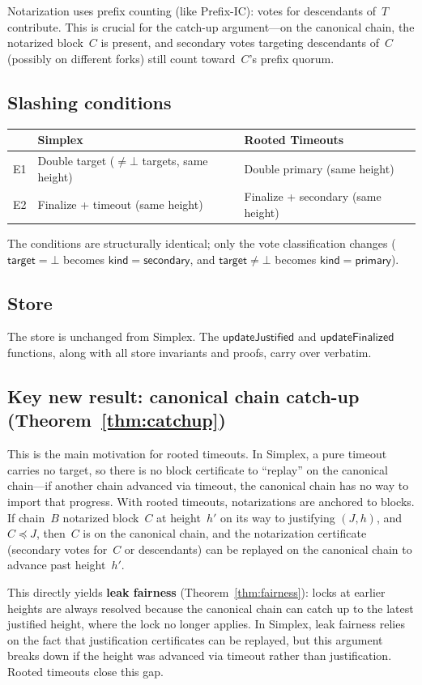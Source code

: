 \ifx\litemode\undefined\documentclass{article}\fi
\theoremstyle{plain}
\theoremstyle{definition}
\theoremstyle{remark}
\begin{document}
Notarization uses prefix counting (like Prefix-IC): votes for descendants of~$T$ contribute.
This is crucial for the catch-up argument---on the canonical chain, the notarized block~$C$ is present, and secondary votes targeting descendants of~$C$ (possibly on different forks) still count toward~$C$'s prefix quorum.

\subsection*{Slashing conditions}

\begin{center}
\begin{tabularx}{\textwidth}{lXX}
\toprule
& \textbf{Simplex} & \textbf{Rooted Timeouts} \\
\midrule
E1 & Double target ($\neq \bot$ targets, same height) & Double primary (same height) \\
E2 & Finalize + timeout (same height) & Finalize + secondary (same height) \\
\bottomrule
\end{tabularx}
\end{center}

The conditions are structurally identical; only the vote classification changes ($\mathsf{target} = \bot$ becomes $\mathsf{kind} = \mathsf{secondary}$, and $\mathsf{target} \neq \bot$ becomes $\mathsf{kind} = \mathsf{primary}$).

\subsection*{Store}

The store is unchanged from Simplex.
The $\textsf{updateJustified}$ and $\textsf{updateFinalized}$ functions, along with all store invariants and proofs, carry over verbatim.

\subsection*{Key new result: canonical chain catch-up (Theorem~\ref{thm:catchup})}

This is the main motivation for rooted timeouts.
In Simplex, a pure timeout carries no target, so there is no block certificate to ``replay'' on the canonical chain---if another chain advanced via timeout, the canonical chain has no way to import that progress.
With rooted timeouts, notarizations are anchored to blocks.
If chain~$B$ notarized block~$C$ at height~$h'$ on its way to justifying $(J, h)$, and $C \preceq J$, then~$C$ is on the canonical chain, and the notarization certificate (secondary votes for~$C$ or descendants) can be replayed on the canonical chain to advance past height~$h'$.

This directly yields \textbf{leak fairness} (Theorem~\ref{thm:fairness}): locks at earlier heights are always resolved because the canonical chain can catch up to the latest justified height, where the lock no longer applies.
In Simplex, leak fairness relies on the fact that justification certificates can be replayed, but this argument breaks down if the height was advanced via timeout rather than justification.
Rooted timeouts close this gap.
\end{document}
